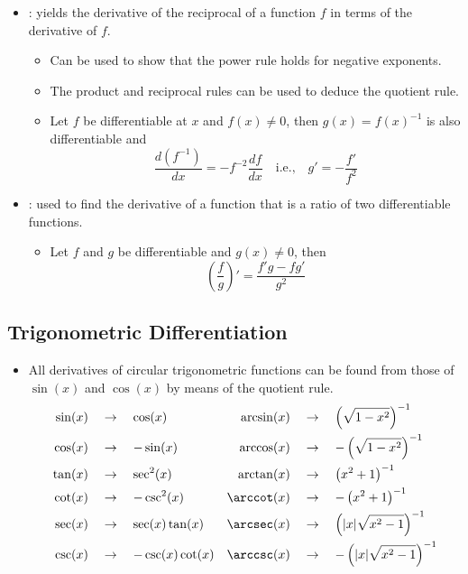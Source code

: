 \begin{itemize}
\begin{itemize}
    \item {}: yields the derivative of the reciprocal
        of a function \( f \) in terms of the
      derivative of \( f \).
      \begin{itemize}
        \item Can be used to show that the power rule holds for negative
          exponents.
        \item The product and reciprocal rules can be used to
          deduce the quotient rule.
        \item Let  \( f \) be differentiable at \( x \) and \( f(x) \neq 0 \),
          then \( g(x) = f(x)^{-1} \) is also differentiable and
          \[
            \frac{d(f^{-1})}{dx} = -f^{-2}\frac{df}{dx} \quad \text{i.e.,}
            \quad g' = -\frac{f'}{f^2}
          \]
      \end{itemize}

    \item {}: used to find the derivative of a function that is
      a ratio of two differentiable functions.
     \begin{itemize}
       \item Let \( f \) and \( g \) be differentiable and \( g(x) \neq 0 \),
         then
         \[
           \left( \frac{f}{g}
           \right) ' = \frac{f'g - fg'}{g^2}
         \]
     \end{itemize}

  \end{itemize}

  \subsection{Trigonometric Differentiation}
  \begin{itemize}
    \item All derivatives of circular trigonometric functions can be found from
      those of \( \sin(x) \) and \( \cos(x) \) by means of the quotient rule.
      \begin{align*}
        \sin(x) \quad &\to \quad  \cos(x) & \arcsin(x) \quad &\to \quad \left( \sqrt{1-x^2} \right)^{-1}   \\
        \cos(x) \quad &\to \quad  -\sin(x) & \arccos(x) \quad &\to \quad -\left( \sqrt{1-x^2}  \right)^{-1} \\
        \tan(x) \quad &\to \quad  \sec^2(x) & \arctan(x) \quad &\to \quad \left( x^2 + 1 \right) ^{-1} \\
        \cot(x) \quad &\to \quad  -\csc^2(x) & \arccot(x) \quad &\to \quad -\left( x^2 + 1 \right) ^{-1}\\
        \sec(x) \quad &\to \quad  \sec(x)\tan(x) & \arcsec(x) \quad &\to \quad \left( |x|\sqrt{x^2 -1}  \right) ^{-1}\\
        \csc(x) \quad &\to \quad -\csc(x)\cot(x) & \arccsc(x) \quad &\to \quad -\left( |x|\sqrt{x^2 -1}  \right) ^{-1}
      \end{align*}


\end{itemize}
\end{itemize}

